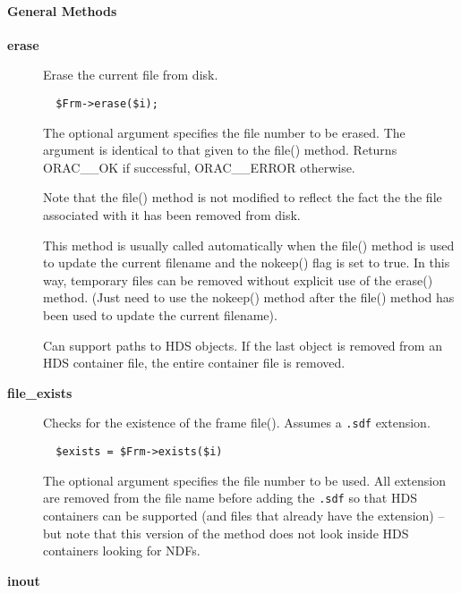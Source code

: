 \paragraph*{General Methods\label{ORAC::Frame::NDF_General_Methods}}
\begin{description}

\item[{\textbf{erase}}] \mbox{}

Erase the current file from disk.

\begin{verbatim}
  $Frm->erase($i);
\end{verbatim}


The optional argument specifies the file number to be erased.
The argument is identical to that given to the file() method.
Returns ORAC\_\_OK if successful, ORAC\_\_ERROR otherwise.



Note that the file() method is not modified to reflect the
fact the the file associated with it has been removed from disk.



This method is usually called automatically when the file()
method is used to update the current filename and the nokeep()
flag is set to true. In this way, temporary files can be removed
without explicit use of the erase() method. (Just need to
use the nokeep() method after the file() method has been used
to update the current filename).



Can support paths to HDS objects. If the last object is removed from
an HDS container file, the entire container file is removed.


\item[{\textbf{file\_exists}}] \mbox{}

Checks for the existence of the frame file(). Assumes a \texttt{.sdf}
extension.

\begin{verbatim}
  $exists = $Frm->exists($i)
\end{verbatim}


The optional argument specifies the file number to be used.
All extension are removed from the file name before adding the
\texttt{.sdf} so that HDS containers can be supported (and files
that already have the extension)  -- but note that
this version of the method does not look inside HDS containers
looking for NDFs.


\item[{\textbf{inout}}] \mbox{}


\end{description}
